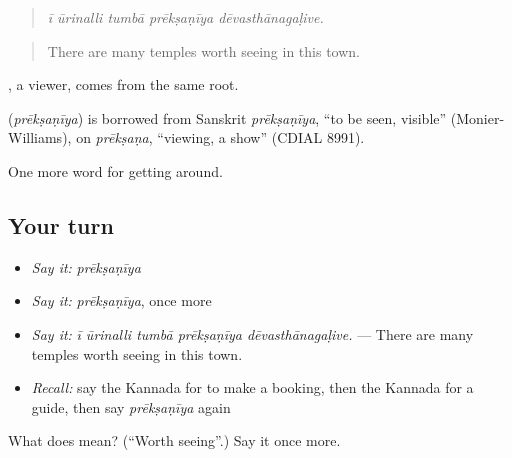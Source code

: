 \begin{quote}
\emph{ī ūrinalli tumbā prēkṣaṇīya dēvasthānagaḷive.}
\end{quote}

\begin{quote}
There are many temples worth seeing in this town.
\end{quote}

, a viewer, comes from the same root.

\begin{cousinweb}
\textbf{} (\emph{prēkṣaṇīya}) is borrowed from Sanskrit \emph{prēkṣaṇīya}, \textquotedblleft{}to be seen, visible\textquotedblright{} (Monier-Williams), on \emph{prēkṣaṇa}, \textquotedblleft{}viewing, a show\textquotedblright{} (CDIAL 8991).
\end{cousinweb}

\begin{grammarlens}[title={What you've built}]
One more word for getting around.
\end{grammarlens}

\subsection*{Your turn}
\begin{itemize}
\raggedright
  \item \emph{Say it:} \emph{prēkṣaṇīya}
  \item \emph{Say it:} \emph{prēkṣaṇīya}, once more
  \item \emph{Say it:} \emph{ī ūrinalli tumbā prēkṣaṇīya dēvasthānagaḷive.} — There are many temples worth seeing in this town.
  \item \emph{Recall:} say the Kannada for to make a booking, then the Kannada for a guide, then say \emph{prēkṣaṇīya} again
\end{itemize}

\begin{tcolorbox}[breakable,colback=teal!4,colframe=teal!35!black,title={Before you move on}]
What does  mean? (\textquotedblleft{}Worth seeing\textquotedblright{}.) Say it once more.
\end{tcolorbox}
